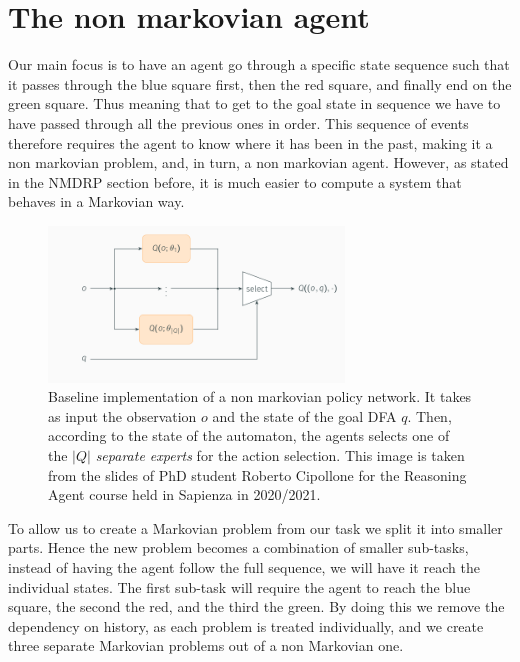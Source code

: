 \documentclass{article}
\renewcommand{\texttt}[1]{%
  \begingroup
  \ttfamily
  \begingroup\lccode`~=`/\lowercase{\endgroup\def~}{/\discretionary{}{}{}}%
  \begingroup\lccode`~=`[\lowercase{\endgroup\def~}{[\discretionary{}{}{}}%
  \begingroup\lccode`~=`.\lowercase{\endgroup\def~}{.\discretionary{}{}{}}%
  \catcode`/=\active\catcode`[=\active\catcode`.=\active
  \scantokens{#1\noexpand}%
  \endgroup
}
\begin{document}

\section{The non markovian agent}\label{sec:non_mark_agent} %
Our main focus is to have an agent go through a specific state sequence such that it passes through the blue square first, then the red square, and finally end on the green square. Thus meaning that to get to the goal state in sequence we have to have passed through all the previous ones in order. This sequence of events therefore requires the agent to know where it has been in the past, making it a non markovian problem, and, in turn, a non markovian agent. 
However, as stated in the NMDRP section before, it is much easier to compute a system that behaves in a Markovian way. \\

\begin{figure}
    \centering
    \includegraphics[width=0.7\textwidth]{images/baseline_implementation_schema.png}
    \caption{Baseline implementation of a non markovian policy network. It takes as input the observation \(o\) and the state of the goal DFA \(q\). Then, according to the state of the automaton, the agents selects one of the \(|Q|\) \textit{separate experts} for the action selection. This image is taken from the slides of PhD student Roberto Cipollone for the Reasoning Agent course held in Sapienza in 2020/2021.}
    \label{fig:baselineSchema}
\end{figure}



\noindent
To allow us to create a Markovian problem from our task we split it into smaller parts. Hence the new problem becomes a combination of smaller sub-tasks, instead of having the agent follow the full sequence, we will have it reach the individual states. The first sub-task will require the agent to reach the blue square, the second the red, and the third the green. By doing this we remove the dependency on history, as each problem is treated individually, and we create three separate Markovian problems out of a non Markovian one. \\
\end{document}
